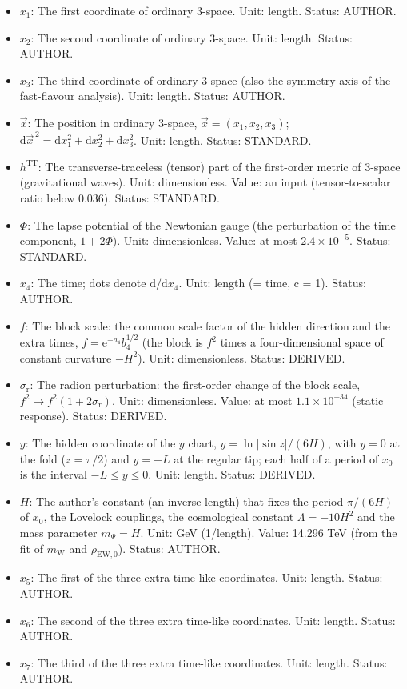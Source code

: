 \documentclass[
  10pt,
]{article}
\begin{document}
\begin{itemize}
\item
  \(x_1\): The first coordinate of ordinary 3-space. Unit: length.
  Status: AUTHOR.
\item
  \(x_2\): The second coordinate of ordinary 3-space. Unit: length.
  Status: AUTHOR.
\item
  \(x_3\): The third coordinate of ordinary 3-space (also the symmetry
  axis of the fast-flavour analysis). Unit: length. Status: AUTHOR.
\item
  \(\vec x\): The position in ordinary 3-space,
  \(\vec x = (x_1, x_2, x_3)\);
  \(\mathrm{d}\vec x^{\,2} = \mathrm{d}x_1^2 + \mathrm{d}x_2^2 + \mathrm{d}x_3^2\).
  Unit: length. Status: STANDARD.
\item
  \(h^{\mathrm{TT}}\): The transverse-traceless (tensor) part of the
  first-order metric of 3-space (gravitational waves). Unit:
  dimensionless. Value: an input (tensor-to-scalar ratio below 0.036).
  Status: STANDARD.
\item
  \(\Phi\): The lapse potential of the Newtonian gauge (the perturbation
  of the time component, \(1 + 2\Phi\)). Unit: dimensionless. Value: at
  most \(2.4\times10^{-5}\). Status: STANDARD.
\item
  \(x_4\): The time; dots denote \(\mathrm{d}/\mathrm{d}x_4\). Unit:
  length (= time, c = 1). Status: AUTHOR.
\item
  \(f\): The block scale: the common scale factor of the hidden
  direction and the extra times, \(f = \mathrm{e}^{-a_4}b_4^{1/2}\) (the
  block is \(f^2\) times a four-dimensional space of constant curvature
  \(-H^2\)). Unit: dimensionless. Status: DERIVED.
\item
  \(\sigma_{\mathrm{r}}\): The radion perturbation: the first-order
  change of the block scale, \(f^2 \to f^2(1 + 2\sigma_{\mathrm{r}})\).
  Unit: dimensionless. Value: at most \(1.1\times10^{-34}\) (static
  response). Status: DERIVED.
\item
  \(y\): The hidden coordinate of the \(y\) chart,
  \(y = \ln\lvert\sin z\rvert/(6H)\), with \(y = 0\) at the fold
  (\(z = \pi/2\)) and \(y = -L\) at the regular tip; each half of a
  period of \(x_0\) is the interval \(-L \le y \le 0\). Unit: length.
  Status: DERIVED.
\item
  \(H\): The author's constant (an inverse length) that fixes the period
  \(\pi/(6H)\) of \(x_0\), the Lovelock couplings, the cosmological
  constant \(\Lambda = -10H^2\) and the mass parameter \(m_\Psi = H\).
  Unit: GeV (1/length). Value: 14.296 TeV (from the fit of
  \(m_{\mathrm{W}}\) and \(\rho_{\mathrm{EW},0}\)). Status: AUTHOR.
\item
  \(x_5\): The first of the three extra time-like coordinates. Unit:
  length. Status: AUTHOR.
\item
  \(x_6\): The second of the three extra time-like coordinates. Unit:
  length. Status: AUTHOR.
\item
  \(x_7\): The third of the three extra time-like coordinates. Unit:
  length. Status: AUTHOR.
\end{itemize}
\end{document}

